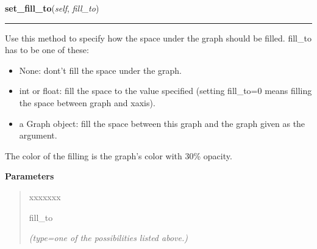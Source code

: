     \label{pygtk_chart:line_chart:Graph:set_fill_to}

    \vspace{0.5ex}

\hspace{.8\funcindent}\begin{boxedminipage}{\funcwidth}

    \raggedright \textbf{set\_fill\_to}(\textit{self}, \textit{fill\_to})

    \vspace{-1.5ex}

    \rule{\textwidth}{0.5\fboxrule}
\setlength{\parskip}{2ex}
    Use this method to specify how the space under the graph should be 
    filled. fill\_to has to be one of these:

    \begin{itemize}
    \setlength{\parskip}{0.6ex}
      \item None: dont't fill the space under the graph.

      \item int or float: fill the space to the value specified (setting 
        fill\_to=0 means filling the space between graph and xaxis).

      \item a Graph object: fill the space between this graph and the graph 
        given as the argument.

    \end{itemize}

    The color of the filling is the graph's color with 30\% opacity.

\setlength{\parskip}{1ex}
      \textbf{Parameters}
      \vspace{-1ex}

      \begin{quote}
        \begin{Ventry}{xxxxxxx}

          \item[fill\_to]

            {\it (type=one of the possibilities listed above.)}

        \end{Ventry}

      \end{quote}

    \end{boxedminipage}


